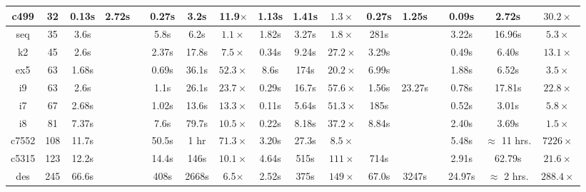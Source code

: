 \begin{table*}[!htbp]
\begin{center}
\begin{tabular}{|c|c|c|c|c|c|c|c|c|c|c|c|c|c|c|c|c|}
\hline 	
c499    &32  &0.13s &2.72s & 		&0.27s &3.2s &11.9$\times$			&1.13s &1.41s &$1.3 \times$ 		&0.27s &1.25s &			&0.09s &2.72s &$30.2 \times$ \\
\hline 
seq     &35 	&3.6s & &		&5.8s &6.2s &$1.1\times$		&1.82s &3.27s &$1.8 \times$ 		&281s & &			&3.22s &16.96s &$5.3 \times$ \\
\hline 
k2      &45	&2.6s & &		&2.37s &17.8s &$7.5\times$		&0.34s &9.24s &$27.2 \times$ 		&3.29s & &			&0.49s &6.40s &$13.1 \times$ \\
\hline 
ex5    &63 	&1.68s & &		&0.69s &36.1s &$52.3\times$		&8.6s &174s &$20.2 \times$ 		&6.99s & &			&1.88s &6.52s &$3.5 \times$ \\
\hline
i9      &63	&2.6s & &		&1.1s &26.1s &$23.7\times$		&0.29s &16.7s &$57.6 \times$ 		&1.56s &23.27s &			&0.78s &17.81s &$22.8 \times$ \\
\hline 
i7      &67	&2.68s & &		&1.02s &13.6s &$13.3\times$		&0.11s &5.64s &$51.3 \times$ 		&185s & &			&0.52s &3.01s &$5.8 \times$ \\
\hline 
i8      &81	&7.37s & &		&7.6s &79.7s &$10.5\times$		&0.22s &8.18s &$37.2 \times$ 		&8.84s & &			&2.40s &3.69s &$1.5 \times$ \\
\hline 
c7552   &108   	&11.7s & &		&50.5s & 1 hr &$71.3\times$		&3.20s &27.3s &$8.5 \times$ 		& & &			&5.48s &$\approx$ 11 hrs. &$7226 \times$ \\
\hline 
c5315   &123   	&12.2s & &		&14.4s &146s &$10.1\times$		&4.64s &515s &$111 \times$ 		&714s & &			&2.91s &62.79s &$21.6 \times$ \\
\hline 
des     &245	&66.6s & &		&408s &2668s &6.5$\times$		&2.52s &375s &$149 \times$ 		&67.0s &3247s &			&24.97s &$\approx$ 2 hrs. &$288.4 \times$ \\
\hline 
\end{tabular}
\end{center}
\end{table*}


